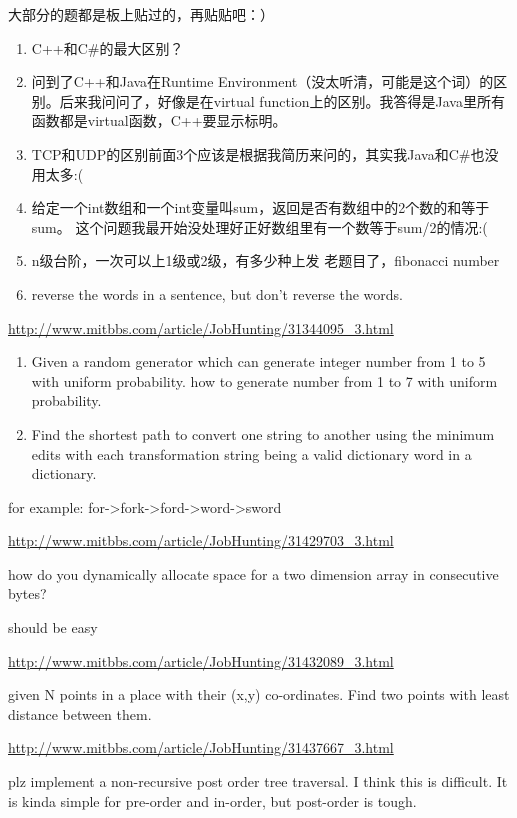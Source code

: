 \documentclass[12pt]{book}
\begin{document}
大部分的题都是板上贴过的，再贴贴吧：）
\begin{enumerate}
\item C++和C\#的最大区别？
\item 问到了C++和Java在Runtime Environment（没太听清，可能是这个词）的区别。后来我问问了，好像是在virtual function上的区别。我答得是Java里所有函数都是virtual函数，C++要显示标明。
\item TCP和UDP的区别前面3个应该是根据我简历来问的，其实我Java和C\#也没用太多:(
\item 给定一个int数组和一个int变量叫sum，返回是否有数组中的2个数的和等于sum。 这个问题我最开始没处理好正好数组里有一个数等于sum/2的情况:(
\item n级台阶，一次可以上1级或2级，有多少种上发 老题目了，fibonacci number
\item reverse the words in a sentence, but don't reverse the words.
\end{enumerate}

\url{http://www.mitbbs.com/article/JobHunting/31344095_3.html}

\begin{enumerate}
\item Given a random generator which can generate integer number from 1 to 5 with uniform probability. how to generate number from 1 to 7 with uniform probability.

\item Find the shortest path to convert one string to another using the minimum edits with each transformation string being a valid dictionary word in a dictionary.
\end{enumerate}

for example: for->fork->ford->word->sword

\url{http://www.mitbbs.com/article/JobHunting/31429703_3.html}

how do you dynamically allocate space for a two dimension array in consecutive bytes? 

should be easy

\url{http://www.mitbbs.com/article/JobHunting/31432089_3.html}

given N points in a place with their (x,y) co-ordinates. Find two points with least distance between them.

\url{http://www.mitbbs.com/article/JobHunting/31437667_3.html}

plz implement a non-recursive post order tree traversal. I think this is difficult. It is kinda simple for pre-order and in-order, but post-order is tough.
\end{document}
